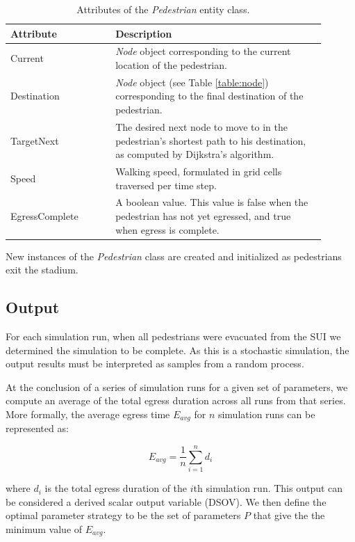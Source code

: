 \documentclass[12pt]{article}
\begin{document}
\def\arraystretch{1.5}
\begin{table}[hb!]
  \centering
    \begin{tabular}{p{0.3\linewidth}p{0.6\linewidth}}
     \hline
     Attribute & Description \\
     \hline
     Current        & \textit{Node} object corresponding to the current
                      location of the pedestrian. \\
     Destination    & \textit{Node} object (see Table \ref{table:node})
                      corresponding to the final destination of the
                      pedestrian. \\
     TargetNext     & The desired next node to move to in the pedestrian's
                      shortest path to his destination, as computed by
                      Dijkstra's algorithm. \\
     Speed          & Walking speed, formulated in grid cells traversed per
                      time step. \\
     EgressComplete & A boolean value. This value is false when the pedestrian
                      has not yet egressed, and true when egress is complete. \\
     \hline
    \end{tabular}
    \caption{Attributes of the \textit{Pedestrian} entity class.}
  \label{table:ped}
\end{table}

New instances of the \textit{Pedestrian} class are created and initialized
as pedestrians exit the stadium.

\subsection{Output}
For each simulation run, when all pedestrians were evacuated from the SUI we
determined the simulation to be complete. As this is a stochastic simulation,
the output results must be interpreted as samples from a random process.

At the conclusion of a series of simulation runs for a given set of parameters,
we compute an average of the total egress duration across all runs from that
series. More formally, the average egress time $E_{avg}$ for $n$ simulation runs
can be represented as:

\begin{equation}
E_{avg} = \frac{1}{n}\sum\limits_{i=1}^n d_i
\end{equation}

where $d_i$ is the total egress duration of the $i$th simulation run. This
output can be considered a derived scalar output variable (DSOV). We then
define the optimal parameter strategy to be the set of parameters $P$ that
give the the minimum value of $E_{avg}$.
\end{document}
